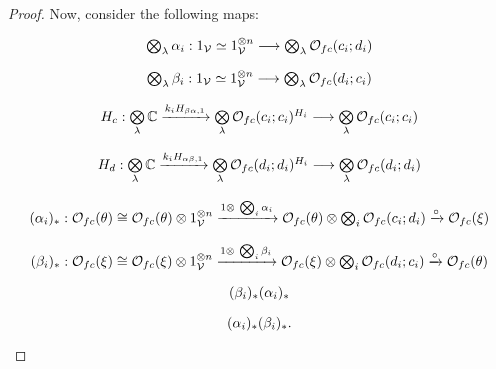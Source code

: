 \documentclass[a4paper,10pt
,draft
]{article}%
\renewcommand{\1}{\ensuremath{\mathbb{id}}}
\begin{document}
\begin{proof}
      Now, consider the following maps:
      \begin{equation}
            \begin{tikzcd}[row sep = tiny]
                  \bigotimes_\lambda \alpha_i: 1_\V \simeq 1_\V^{\otimes n} \longrightarrow \bigotimes_\lambda \O_{f c}(c_i;d_i)
                  \\ %
                  \bigotimes_\lambda \beta_i: 1_\V \simeq 1_\V^{\otimes n} \longrightarrow \bigotimes_\lambda \O_{f c}(d_i;c_i)
                  \\ %
                  H_c: \bigotimes\limits_\lambda \mathbb C \xrightarrow{k_i H_{\beta\alpha,1}}
                  \bigotimes\limits_\lambda \O_{f c}(c_i;c_i)^{H_i} \longrightarrow
                  \bigotimes\limits_\lambda \O_{f c}(c_i;c_i)
                  \\ %
                  H_d: \bigotimes\limits_\lambda \mathbb C \xrightarrow{k_i H_{\alpha\beta,1}}
                  \bigotimes\limits_\lambda \O_{f c}(d_i;d_i)^{H_i} \longrightarrow
                  \bigotimes\limits_\lambda \O_{f c}(d_i;d_i)
                  \\ %
                  (\alpha_i)_{\**} : 
                  \O_{f c}(\theta)
                  \cong
                  \O_{f c}(\theta) \otimes 1_\V^{\otimes n} \xrightarrow{1 \otimes\ \bigotimes_i \alpha_i}
                  \O_{f c}(\theta) \otimes \bigotimes_i \O_{f c}(c_i;d_i) \xrightarrow{\circ}
                  \O_{f c}(\ksi)
                  \\ %
                  (\beta_i)_{\**} :
                  \O_{f c}(\ksi)
                  \cong
                  \O_{f c}(\ksi) \otimes 1_\V^{\otimes n} \xrightarrow{1 \otimes\ \bigotimes_i \beta_i}
                  \O_{f c}(\ksi) \otimes \bigotimes_i \O_{f c}(d_i;c_i) \xrightarrow{\circ}
                  \O_{f c}(\theta)
                  \\ %
                  (\beta_i)_{\**}(\alpha_i)_{\**}
                  \\ %
                  (\alpha_i)_{\**}(\beta_i)_{\**}.
            \end{tikzcd}
      \end{equation}

\end{proof}
\end{document}

